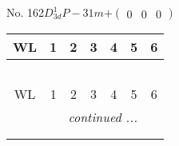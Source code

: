 \documentclass[fleqn,9pt,landscape]{jsarticle}
\begin{document}
\newpage
No. 162\quad$D_{3d}^{1}$\quad$P-31m$\quad[ trigonal ]\quad$+\begin{pmatrix} 0 & 0 & 0 \end{pmatrix}$
\begin{center}
\renewcommand{\arraystretch}{1.2}
\begin{longtable}{ccccccc}
 \hline \hline
WL & 1 & 2 & 3 & 4 & 5 & 6 \\ \hline \endfirsthead

\multicolumn{6}{l}{\tablename\ \thetable{}} \\
 \hline \hline
WL & 1 & 2 & 3 & 4 & 5 & 6 \\ \hline \endhead

 \hline \hline
\multicolumn{6}{r}{\footnotesize\it continued ...} \\ \endfoot

 \hline \hline
\multicolumn{6}{r}{} \\ \endlastfoot


\end{longtable}
\end{center}
\end{document}
